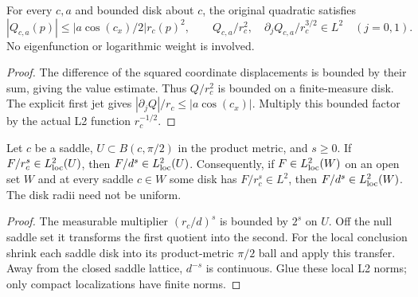 \begin{lemma}
\label{lem:saddle-quadratic-forcing-mass}
\leanok
For every $c,a$ and bounded disk about $c$, the original quadratic satisfies
\[
 |Q_{c,a}(p)|\le |a\cos(c_x)/2|r_c(p)^2,\qquad
 Q_{c,a}/r_c^2,\quad \partial_jQ_{c,a}/r_c^{3/2}\in L^2
 \quad(j=0,1).
\]
No eigenfunction or logarithmic weight is involved.
\end{lemma}

\begin{proof}
\leanok
The difference of the squared coordinate displacements is bounded by their
sum, giving the value estimate. Thus $Q/r_c^2$ is bounded on a finite-measure
disk. The explicit first jet gives $|\partial_jQ|/r_c\le|a\cos(c_x)|$.
Multiply this bounded factor by the actual L2 function $r_c^{-1/2}$.
\end{proof}

\begin{lemma}
\label{lem:saddle-distance-weight-transfer}
\leanok
Let $c$ be a saddle, $U\subset B(c,\pi/2)$ in the product metric, and $s\ge0$.
If $F/r_c^s\in L^2_{\rm loc}(U)$, then $F/d^s\in L^2_{\rm loc}(U)$.
Consequently, if $F\in L^2_{\rm loc}(W)$ on an open set $W$ and at
every saddle $c\in W$ some disk has $F/r_c^s\in L^2$, then
$F/d^s\in L^2_{\rm loc}(W)$.
The disk radii need not be uniform.
\end{lemma}

\begin{proof}
\leanok
The measurable multiplier $(r_c/d)^s$ is bounded by $2^s$ on $U$.
Off the null saddle set it transforms the first quotient into the second.
For the local conclusion shrink each saddle disk into its product-metric
$\pi/2$ ball and apply this transfer. Away from the closed saddle lattice,
$d^{-s}$ is continuous. Glue these local L2 norms; only compact
localizations have finite norms.
\end{proof}

